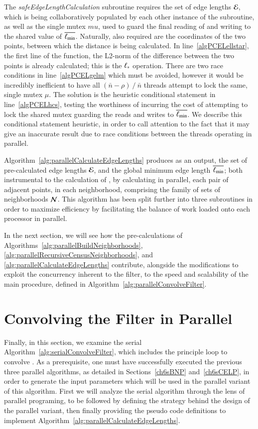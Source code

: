 The \textit{safeEdgeLengthCalculation} subroutine requires the set of edge lengths $\mathcal{E}$, which is being collaboratively populated by each other instance of the subroutine, as well as the single mutex $mu$, used to guard the final reading of and writing to the shared value of $\overline{\ell_\text{min}}$. Naturally, also required are the coordinates of the two points, between which the distance is being calculated. In line~\ref{algPCELellstar}, the first line of the function, the L2-norm of the difference between the two points is already calculated; this is the $\ell_\ast$ operation. There are two race conditions in line~\ref{algPCELgelm} which must be avoided, however it would be incredibly inefficient to have all $(\bar{n}-\rho)\mathbin{/}\bar{n}$ threads attempt to lock the same, single mutex $\mu$. The solution is the heuristic conditional statement in line~\ref{algPCELhcs}, testing the worthiness of incurring the cost of attempting to lock the shared mutex guarding the reads and writes to $\overline{\ell_\text{min}}$. We describe this conditional statement heuristic, in order to call attention to the fact that it may give an inaccurate result due to race conditions between the threads operating in parallel. 

Algorithm~\ref{alg:parallelCalculateEdgeLengths} produces as an output, the set of pre-calculated edge lengths $\mathcal{E}$, and the global minimum edge length $\overline{\ell_\text{min}}$; both instrumental to the calculation of , by calculating in parallel, each pair of adjacent points, in each neighborhood, comprising the family of sets of neighborhoods $\mathcal{N}$. This algorithm has been split further into three subroutines in order to maximize efficiency by facilitating the balance of work loaded onto each processor in parallel.

In the next section, we will see how the pre-calculations of Algorithms~\ref{alg:parallelBuildNeighborhoods}, \ref{alg:parallelRecursiveCensusNeighborhoods}, and \ref{alg:parallelCalculateEdgeLengths} contribute, alongside the modifications to exploit the concurrency inherent to the filter, to the speed and scalability of the main procedure, defined in Algorithm~\ref{alg:parallelConvolveFilter}.

%
%
%
%
\section{Convolving the Filter in Parallel}
\label{ch6sCFP}
Finally, in this section, we examine the serial Algorithm~\ref{alg:serialConvolveFilter}, which includes the principle loop to convolve . As a prerequisite, one must have successfully executed the previous three parallel algorithms, as detailed in Sections~\ref{ch6sBNP} and~\ref{ch6sCELP}, in order to generate the input parameters which will be used in the parallel variant of this algorithm. First we will analyze the serial algorithm through the lens of parallel programing, to be followed by defining the strategy behind the design of the parallel variant, then finally providing the pseudo code definitions to implement Algorithm~\ref{alg:parallelCalculateEdgeLengths}.

